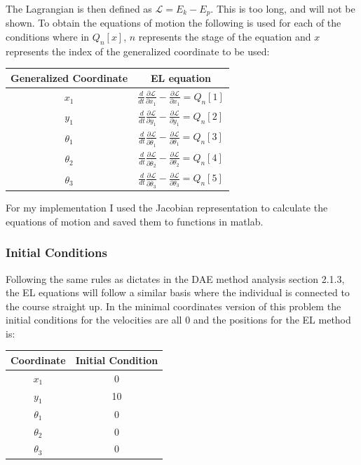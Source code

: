 \documentclass{article}
\begin{document}
The Lagrangian is then defined as $\mathcal{L} = E_k - E_p$. This is too long, and will not be shown. To obtain the equations of motion the following is used for each of the conditions where in $Q_n[x]$, $n$ represents the stage of the equation and $x$ represents the index of the generalized coordinate to be used:
\begin{center}
	\begin{tabular}{c|c}
		Generalized Coordinate & EL equation\\
		\hline
		$x_1$ & $\frac{d}{dt}\frac{\partial{\mathcal{L}}}{\partial{\dot{x_1}}}-\frac{\partial{\mathcal{L}}}{\partial{x_1}}=Q_n[1]$\\
		$y_1$ & $\frac{d}{dt}\frac{\partial{\mathcal{L}}}{\partial{\dot{y_1}}}-\frac{\partial{\mathcal{L}}}{\partial{y_1}}=Q_n[2]$\\
		$\theta_1$ & $\frac{d}{dt}\frac{\partial{\mathcal{L}}}{\partial{\dot{\theta_1}}}-\frac{\partial{\mathcal{L}}}{\partial{\theta_1}}=Q_n[3]$	\\		
		$\theta_2$ & $\frac{d}{dt}\frac{\partial{\mathcal{L}}}{\partial{\dot{\theta_2}}}-\frac{\partial{\mathcal{L}}}{\partial{\theta_2}}=Q_n[4]$	\\
		$\theta_3$ & $\frac{d}{dt}\frac{\partial{\mathcal{L}}}{\partial{\dot{\theta_3}}}-\frac{\partial{\mathcal{L}}}{\partial{\theta_3}}=Q_n[5]$	\\
	\end{tabular}
\end{center}
For my implementation I used the Jacobian representation to calculate the equations of motion and saved them to functions in matlab. 
\subsubsection{Initial Conditions}
Following the same rules as dictates in the DAE method analysis section 2.1.3, the EL equations will follow a similar basis where the individual is connected to the course straight up. In the minimal coordinates version of this problem the initial conditions for the velocities are all 0 and the positions for the EL method is:
\begin{center}
	\begin{tabular}{c|c}
		Coordinate&Initial Condition\\
		\hline
		$x_1$&0\\
		$y_1$&10\\
		$\theta_1$&0\\
		$\theta_2$&0\\
		$\theta_3$&0
	\end{tabular}
\end{center}
\end{document}
